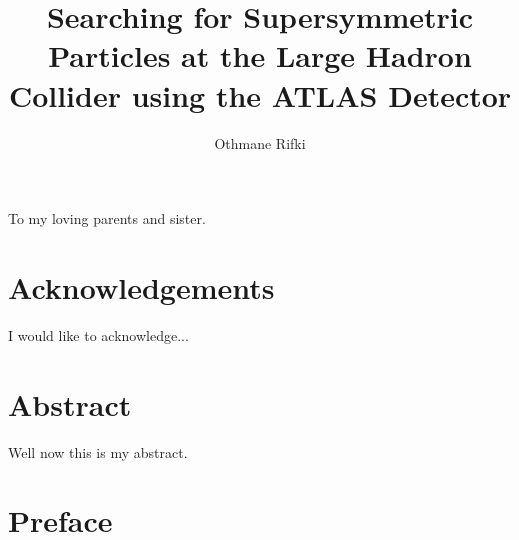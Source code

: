 \documentclass{outhesis}
\begin{document}
\author{Othmane Rifki}
\title{Searching for Supersymmetric Particles at the Large Hadron Collider using the ATLAS Detector}
\address{Norman, Oklahoma}


\begin{dedication}
  To my loving parents and sister.
\end{dedication}


\frontmatter
\maketitle

\chapter*{Acknowledgements}
%
I would like to acknowledge...


\chapter*{Abstract}
%
Well now this is my abstract.


\chapter*{Preface}\label{chap:preface}
%




\mainmatter
\end{document}
